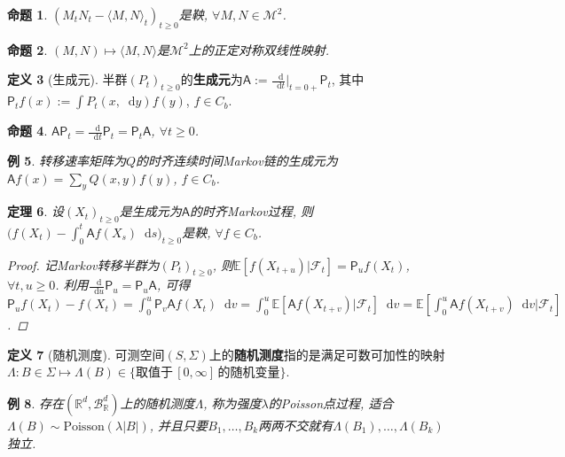 \documentclass{ctexart}
\theoremstyle{definition}
\newtheorem{Def}{定义}[section]
\theoremstyle{remark}
\theoremstyle{plain}
\newtheorem{Prop}[Def]{命题}
\newtheorem{Thm}[Def]{定理}
\newtheorem{Eg}[Def]{例}
\newcommand{\1}{\mathbbm{1}}				%
\newcommand{\E}{\mathbb{E}}					%
\newcommand{\agp}[1]{\langle #1 \rangle}	%
\newcommand{\abs}[1]{\lvert#1\rvert}			%
\newcommand{\R}{\mathbb{R}}					%
\renewcommand*{\d}{\mathop{}\!\mathrm{d}}	%
\begin{document}
\begin{Prop}
$(M_{t}N_{t}-\agp{M,N}_{t})_{t \ge 0}$是鞅, $\forall M,N \in \mathcal{M}^2$.
\end{Prop}

\begin{Prop}
$(M,N) \mapsto \agp{M,N}$是$\mathcal{M}^{2}$上的正定对称双线性映射.
\end{Prop}

\begin{Def}[生成元]
半群$(P_{t})_{t \ge 0}$的\textbf{生成元}为$\mathsf{A} := \frac{\d}{\d t}\big|_{t=0+} \mathsf{P}_{t}$, 其中$\mathsf{P}_{t}f(x) := \int P_{t}(x,\d y) f(y)$, $f \in C_{b}$.
\end{Def}

\begin{Prop}
$\mathsf{A}\mathsf{P}_{t} = \frac{\d}{\d t} \mathsf{P}_{t} = \mathsf{P}_{t}\mathsf{A}$, $\forall t \ge 0$.
\end{Prop}

\begin{Eg}
转移速率矩阵为$Q$的时齐连续时间Markov链的生成元为$\mathsf{A}f(x) = \sum_{y} Q(x,y) f(y)$, $f \in C_{b}$.
\end{Eg}

\begin{Thm}
设$(X_{t})_{t \ge 0}$是生成元为$\mathsf{A}$的时齐Markov过程, 则$\big( f(X_{t}) - \int_{0}^{t} \mathsf{A}f(X_{s}) \d s \big)_{t \ge 0}$是鞅, $\forall f \in C_{b}$.
\begin{proof}
记Markov转移半群为$(P_{t})_{t \ge 0}$, 则$\E[f(X_{t+u})|\mathscr{F}_{t}] = \mathsf{P}_{u}f(X_{t})$, $\forall t, u \ge 0$. 利用$\frac{\d}{\d u} \mathsf{P}_{u} = \mathsf{P}_{u}\mathsf{A}$, 可得$\mathsf{P}_{u}f(X_{t}) - f(X_{t}) = \int_{0}^{u} \mathsf{P}_{v}\mathsf{A}f(X_{t}) \d v 
= \int_{0}^{u} \E[\mathsf{A}f(X_{t+v})|\mathscr{F}_{t}] \d v 
= \E[ \int_{0}^{u} \mathsf{A}f(X_{t+v}) \d v |\mathscr{F}_{t}]$.
\end{proof}
\end{Thm}

\begin{Def}[随机测度]
可测空间$(S,\Sigma)$上的\textbf{随机测度}指的是满足可数可加性的映射$\Lambda : B \in \Sigma \mapsto \Lambda(B) \in \{ \text{取值于}\,[0,\infty]\,\text{的}\text{随机变量} \}$.
\end{Def}

\begin{Eg}
存在$(\R^{d},\mathscr{B}_{\R}^{d})$上的随机测度$\Lambda$, 称为强度$\lambda$的Poisson点过程, 适合$\Lambda(B) \sim \mathrm{Poisson}(\lambda\abs{B})$, 并且只要$B_{1},\dots,B_{k}$两两不交就有$\Lambda(B_{1}),\dots,\Lambda(B_{k})$独立.
\end{Eg}
\end{document}

